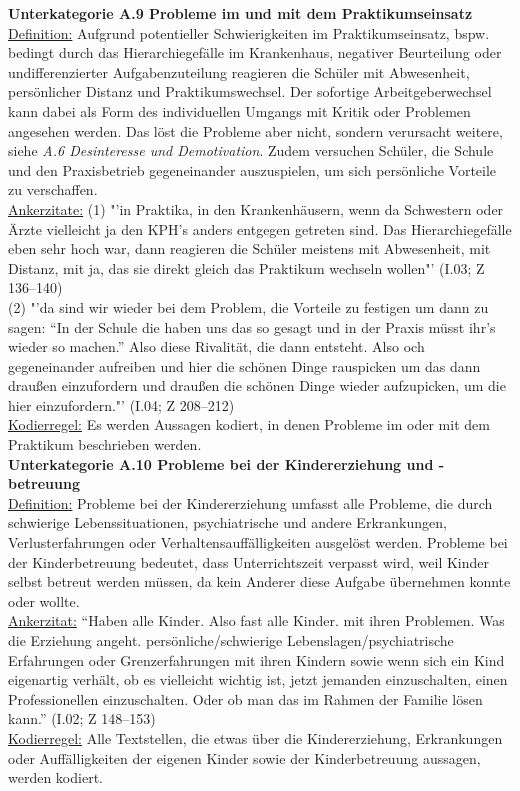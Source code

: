 \noindent
\textbf{Unterkategorie A.9 Probleme im und mit dem Praktikumseinsatz}\\
\underline{Definition:} Aufgrund potentieller Schwierigkeiten im Praktikumseinsatz, bspw. bedingt durch das Hierarchiegefälle im Krankenhaus, negativer Beurteilung oder undifferenzierter Aufgabenzuteilung reagieren die Schüler mit Abwesenheit, persönlicher Distanz und Praktikumswechsel. Der sofortige Arbeitgeberwechsel kann dabei als Form des individuellen Umgangs mit Kritik oder Problemen angesehen werden. Das löst die Probleme aber nicht, sondern verursacht weitere, siehe \textit{A.6 Desinteresse und Demotivation}. Zudem versuchen Schüler, die Schule und den Praxisbetrieb gegeneinander auszuspielen, um sich persönliche Vorteile zu verschaffen.\\
\underline{Ankerzitate:} (1) "'in Praktika, in den Krankenhäusern, wenn da Schwestern oder Ärzte vielleicht ja den KPH's anders entgegen getreten sind. Das Hierarchiegefälle eben sehr hoch war, dann reagieren die Schüler meistens mit Abwesenheit, mit Distanz, mit ja, das sie direkt gleich das Praktikum wechseln wollen"' (I.03; Z 136--140)\\ (2) "'da sind wir wieder bei dem Problem, die Vorteile zu festigen um dann zu sagen: "`In der Schule die haben uns das so gesagt und in der Praxis müsst ihr's wieder so machen."' Also diese Rivalität, die dann entsteht. Also och gegeneinander aufreiben und hier die schönen Dinge rauspicken um das dann draußen einzufordern und draußen die schönen Dinge wieder aufzupicken, um die hier einzufordern."' (I.04; Z 208--212)\\
\underline{Kodierregel:} Es werden Aussagen kodiert, in denen Probleme im oder mit dem Praktikum beschrieben werden.\\

\noindent
\textbf{Unterkategorie A.10 Probleme bei der Kindererziehung und -betreuung}\\
\underline{Definition:} Probleme bei der Kindererziehung umfasst alle Probleme, die durch schwierige Lebenssituationen, psychiatrische und andere Erkrankungen, Verlusterfahrungen oder Verhaltensauffälligkeiten ausgelöst werden. Probleme bei der Kinderbetreuung bedeutet, dass Unterrichtszeit verpasst wird, weil Kinder selbst betreut werden müssen, da kein Anderer diese Aufgabe übernehmen konnte oder wollte. \\
\underline{Ankerzitat:} "`Haben alle Kinder. Also fast alle Kinder. mit ihren Problemen. Was die Erziehung angeht. persönliche/schwierige Lebenslagen/psychiatrische Erfahrungen oder Grenzerfahrungen mit ihren Kindern sowie wenn sich ein Kind eigenartig verhält, ob es vielleicht wichtig ist, jetzt jemanden einzuschalten, einen Professionellen einzuschalten. Oder ob man das im Rahmen der Familie lösen kann."' (I.02; Z 148--153)\\
\underline{Kodierregel:} Alle Textstellen, die etwas über die Kindererziehung, Erkrankungen oder Auffälligkeiten der eigenen Kinder sowie der Kinderbetreuung aussagen, werden kodiert.\\

